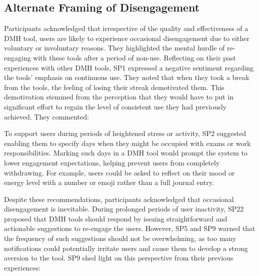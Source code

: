 \subsection{Alternate Framing of Disengagement}

Participants acknowledged that irrespective of the quality and effectiveness of a DMH tool, users are likely to experience occasional disengagement due to either voluntary or involuntary reasons. They highlighted the mental hurdle of re-engaging with these tools after a period of non-use. Reflecting on their past experiences with other DMH tools, SP1 expressed a negative sentiment regarding the tools' emphasis on continuous use. They noted that when they took a break from the tools, the feeling of losing their streak demotivated them. This demotivation stemmed from the perception that they would have to put in significant effort to regain the level of consistent use they had previously achieved. They commented:


\noindent
To support users during periods of heightened stress or activity, SP2 suggested enabling them to specify days when they might be occupied with exams or work responsibilities. Marking such days in a DMH tool would prompt the system to lower engagement expectations, helping prevent users from completely withdrawing. For example, users could be asked to reflect on their mood or energy level with a number or emoji rather than a full journal entry. 

Despite these recommendations, participants acknowledged that occasional disengagement is inevitable.  
During prolonged periods of user inactivity, SP22 proposed that DMH tools should respond by issuing straightforward and actionable suggestions to re-engage the users. However, SP5 and SP9 warned that the frequency of such suggestions should not be overwhelming, as too many notifications could potentially irritate users and cause them to develop a strong aversion to the tool. 
SP9 shed light on this perspective from their previous experiences:

